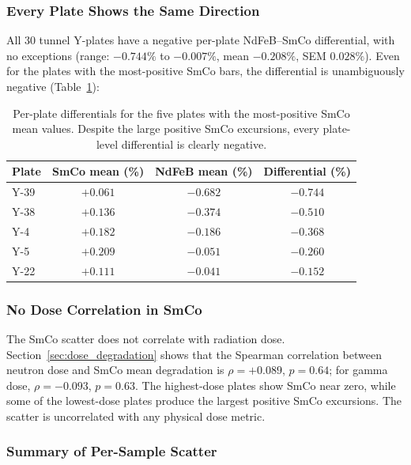 \documentclass[11pt,letterpaper]{article}
\newcommand{\ndfeb}{NdFeB}
\newcommand{\smco}{SmCo}
\begin{document}
\subsubsection{Every Plate Shows the Same Direction}

All 30 tunnel Y-plates have a negative per-plate \ndfeb{}--\smco{}
differential, with no exceptions (range: $-0.744\%$ to $-0.007\%$, mean
$-0.208\%$, SEM $0.028\%$).  Even for the plates with the most-positive
\smco{} bars, the differential is unambiguously negative
(Table~\ref{tab:worst_case_plates}):

\begin{table}[H]
\centering
\caption{Per-plate differentials for the five plates with the most-positive
\smco{} mean values.  Despite the large positive \smco{} excursions, every
plate-level differential is clearly negative.}
\label{tab:worst_case_plates}
\begin{tabular}{@{}lccc@{}}
\toprule
\textbf{Plate} & \textbf{SmCo mean (\%)} & \textbf{NdFeB mean (\%)} & \textbf{Differential (\%)} \\
\midrule
Y-39 & $+0.061$ & $-0.682$ & $-0.744$ \\
Y-38 & $+0.136$ & $-0.374$ & $-0.510$ \\
Y-4  & $+0.182$ & $-0.186$ & $-0.368$ \\
Y-5  & $+0.209$ & $-0.051$ & $-0.260$ \\
Y-22 & $+0.111$ & $-0.041$ & $-0.152$ \\
\bottomrule
\end{tabular}
\end{table}

\subsubsection{No Dose Correlation in SmCo}

The \smco{} scatter does not correlate with radiation dose.
Section~\ref{sec:dose_degradation} shows that the Spearman correlation between
neutron dose and \smco{} mean degradation is $\rho = +0.089$, $p = 0.64$; for
gamma dose, $\rho = -0.093$, $p = 0.63$.  The highest-dose plates show
\smco{} near zero, while some of the lowest-dose plates produce the largest
positive \smco{} excursions.  The scatter is uncorrelated with any physical
dose metric.

\subsubsection{Summary of Per-Sample Scatter}
\end{document}
